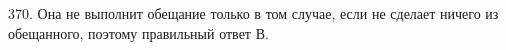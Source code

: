 370. Она не выполнит обещание только в том случае, если не сделает ничего из обещанного, поэтому правильный ответ В.\\
